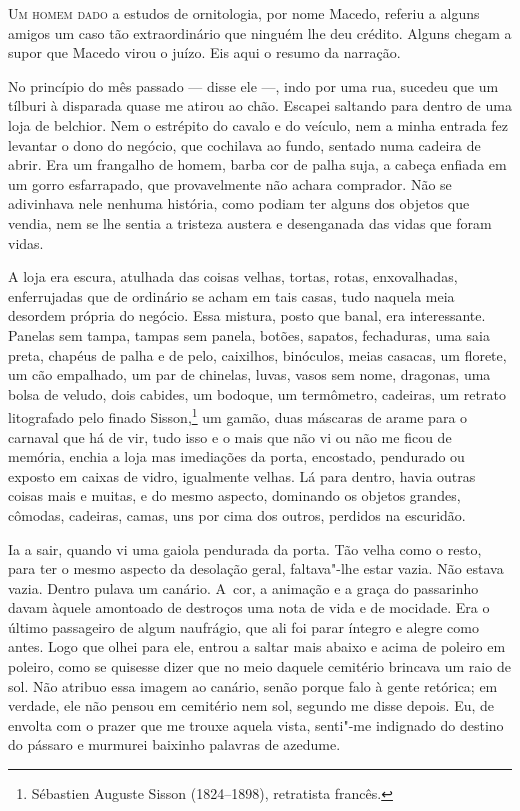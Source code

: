 \begin{linenumbers}

\textsc{Um homem dado} a estudos de ornitologia, por nome Macedo, referiu a
alguns amigos um caso tão extraordinário que ninguém lhe deu crédito.
Alguns chegam a supor que Macedo virou o juízo. Eis aqui o resumo da
narração.

No princípio do mês passado --- disse ele ---, indo por uma rua, sucedeu
que um tílburi à disparada quase me atirou ao chão. Escapei saltando
para dentro de uma loja de belchior. Nem o estrépito do cavalo e do
veículo, nem a minha entrada fez levantar o dono do negócio, que
cochilava ao fundo, sentado numa cadeira de abrir. Era um frangalho de
homem, barba cor de palha suja, a cabeça enfiada em um gorro
esfarrapado, que provavelmente não achara comprador. Não se adivinhava
nele nenhuma história, como podiam ter alguns dos objetos que vendia,
nem se lhe sentia a tristeza austera e desenganada das vidas que foram
vidas.

A loja era escura, atulhada das coisas velhas, tortas, rotas,
enxovalhadas, enferrujadas que de ordinário se acham em tais casas, tudo
naquela meia desordem própria do negócio. Essa mistura, posto que banal,
era interessante. Panelas sem tampa, tampas sem panela, botões, sapatos,
fechaduras, uma saia preta, chapéus de palha e de pelo, caixilhos,
binóculos, meias casacas, um florete, um cão empalhado, um par de
chinelas, luvas, vasos sem nome, dragonas, uma bolsa de veludo, dois
cabides, um bodoque, um termômetro, cadeiras, um retrato litografado
pelo finado Sisson,\footnote{Sébastien Auguste Sisson (1824--1898),
  retratista francês.} um gamão, duas máscaras de arame para o carnaval
que há de vir, tudo isso e o mais que não vi ou não me ficou de memória,
enchia a loja mas imediações da porta, encostado, pendurado ou exposto
em caixas de vidro, igualmente velhas. Lá para dentro, havia outras
coisas mais e muitas, e do mesmo aspecto, dominando os objetos grandes,
cômodas, cadeiras, camas, uns por cima dos outros, perdidos na
escuridão.

Ia a sair, quando vi uma gaiola pendurada da porta. Tão velha como o
resto, para ter o mesmo aspecto da desolação geral, faltava"-lhe estar
vazia. Não estava vazia. Dentro pulava um canário. A~cor, a animação e a
graça do passarinho davam àquele amontoado de destroços uma nota de vida
e de mocidade. Era o último passageiro de algum naufrágio, que ali foi
parar íntegro e alegre como antes. Logo que olhei para ele, entrou a
saltar mais abaixo e acima de poleiro em poleiro, como se quisesse dizer
que no meio daquele cemitério brincava um raio de sol. Não atribuo essa
imagem ao canário, senão porque falo à gente retórica; em verdade, ele
não pensou em cemitério nem sol, segundo me disse depois. Eu, de envolta
com o prazer que me trouxe aquela vista, senti"-me indignado do destino
do pássaro e murmurei baixinho palavras de azedume.


\end{linenumbers}
